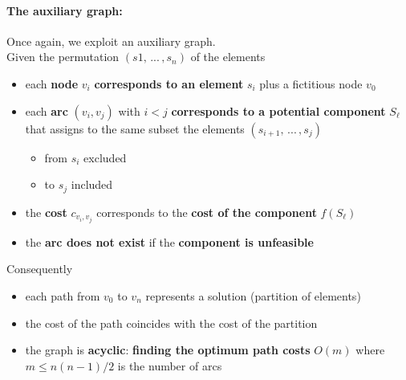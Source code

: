 \paragraph{The auxiliary graph:} Once again, we exploit an auxiliary graph. \\
Given the permutation $(s1, \, ... \, , s_n)$ of the elements
\begin{itemize}
	\item each \textbf{node} $v_i$ \textbf{corresponds to an element} $s_i$ plus a fictitious node $v_0$
	
	\item each \textbf{arc} $(v_i , v_j )$ with $i < j$ \textbf{corresponds to a potential component} $S_{\ell}$ that assigns to the same subset the elements $(s_{i+1}, \, ... \, , s_j)$
	\begin{itemize}
		\item from $s_i$ excluded
		\item to $s_j$ included
	\end{itemize}
	
	\item the \textbf{cost} $c_{v_i ,v_j}$ corresponds to the \textbf{cost of the component} $f (S_{\ell})$
	
	\item the \textbf{arc does not exist} if the \textbf{component is unfeasible}
\end{itemize}

Consequently
\begin{itemize}
	\item each path from $v_0$ to $v_n$ represents a solution (partition of elements)
	
	\item the cost of the path coincides with the cost of the partition
	
	\item the graph is \textbf{acyclic}: \textbf{finding the optimum path costs} $O (m)$ where $m \le n (n − 1) /2$ is the number of arcs
\end{itemize}

\newpage

